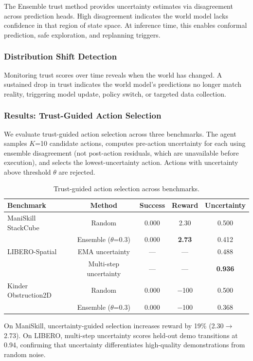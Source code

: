 \documentclass{article}
\begin{document}
The Ensemble trust method provides uncertainty estimates via disagreement across prediction heads. High disagreement indicates the world model lacks confidence in that region of state space. At inference time, this enables conformal prediction, safe exploration, and replanning triggers.

\subsubsection{Distribution Shift Detection}

Monitoring trust scores over time reveals when the world has changed. A sustained drop in trust indicates the world model's predictions no longer match reality, triggering model update, policy switch, or targeted data collection.

\subsubsection{Results: Trust-Guided Action Selection}

We evaluate trust-guided action selection across three benchmarks. The agent samples $K$=10 candidate actions, computes pre-action uncertainty for each using ensemble disagreement (not post-action residuals, which are unavailable before execution), and selects the lowest-uncertainty action. Actions with uncertainty above threshold $\theta$ are rejected.

\begin{table}[h]
\centering
\caption{Trust-guided action selection across benchmarks.}
\label{tab:inference_trust}
\small
\begin{tabular}{lcccc}
\toprule
Benchmark & Method & Success & Reward & Uncertainty \\
\midrule
ManiSkill StackCube & Random & 0.000 & 2.30 & 0.500 \\
 & Ensemble ($\theta$=0.3) & 0.000 & \textbf{2.73} & 0.412 \\
\midrule
LIBERO-Spatial & EMA uncertainty & --- & --- & 0.488 \\
 & Multi-step uncertainty & --- & --- & \textbf{0.936} \\
\midrule
Kinder Obstruction2D & Random & 0.000 & $-$100 & 0.500 \\
 & Ensemble ($\theta$=0.3) & 0.000 & $-$100 & 0.368 \\
\bottomrule
\end{tabular}
\end{table}

On ManiSkill, uncertainty-guided selection increases reward by 19\% (2.30$\to$2.73). On LIBERO, multi-step uncertainty scores held-out demo transitions at 0.94, confirming that uncertainty differentiates high-quality demonstrations from random noise.
\end{document}
